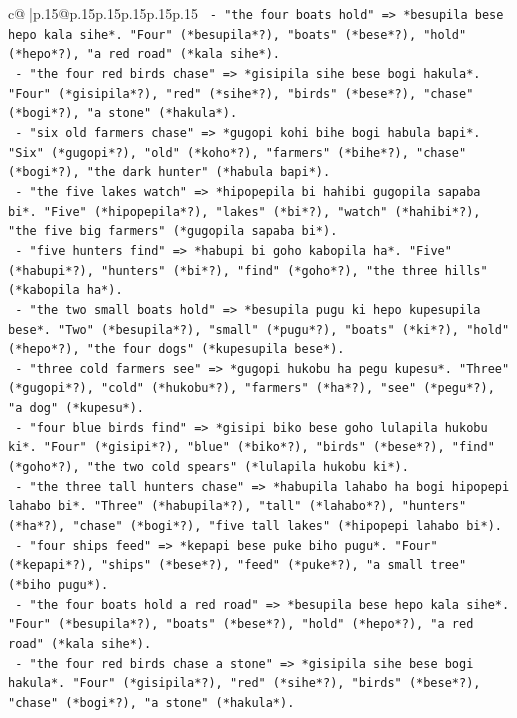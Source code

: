\documentclass{article}
\begin{document}
{\begin{supertabular}{c@{$\;$}|p{.15\linewidth}@{}p{.15\linewidth}p{.15\linewidth}p{.15\linewidth}p{.15\linewidth}p{.15\linewidth}}
{{{\texttt{         {-} "the four boats hold" => *besupila bese hepo kala sihe*. "Four" (*besupila*?), "boats" (*bese*?), "hold" (*hepo*?), "a red road" (*kala sihe*).} \\
\texttt{         {-} "the four red birds chase" => *gisipila sihe bese bogi hakula*. "Four" (*gisipila*?), "red" (*sihe*?), "birds" (*bese*?), "chase" (*bogi*?), "a stone" (*hakula*).} \\
\texttt{         {-} "six old farmers chase" => *gugopi kohi bihe bogi habula bapi*. "Six" (*gugopi*?), "old" (*koho*?), "farmers" (*bihe*?), "chase" (*bogi*?), "the dark hunter" (*habula bapi*).} \\
\texttt{         {-} "the five lakes watch" => *hipopepila bi hahibi gugopila sapaba bi*. "Five" (*hipopepila*?), "lakes" (*bi*?), "watch" (*hahibi*?), "the five big farmers" (*gugopila sapaba bi*).} \\
\texttt{         {-} "five hunters find" => *habupi bi goho kabopila ha*. "Five" (*habupi*?), "hunters" (*bi*?), "find" (*goho*?), "the three hills" (*kabopila ha*).} \\
\texttt{         {-} "the two small boats hold" => *besupila pugu ki hepo kupesupila bese*. "Two" (*besupila*?), "small" (*pugu*?), "boats" (*ki*?), "hold" (*hepo*?), "the four dogs" (*kupesupila bese*).} \\
\texttt{         {-} "three cold farmers see" => *gugopi hukobu ha pegu kupesu*. "Three" (*gugopi*?), "cold" (*hukobu*?), "farmers" (*ha*?), "see" (*pegu*?), "a dog" (*kupesu*).} \\
\texttt{         {-} "four blue birds find" => *gisipi biko bese goho lulapila hukobu ki*. "Four" (*gisipi*?), "blue" (*biko*?), "birds" (*bese*?), "find" (*goho*?), "the two cold spears" (*lulapila hukobu ki*).} \\
\texttt{         {-} "the three tall hunters chase" => *habupila lahabo ha bogi hipopepi lahabo bi*. "Three" (*habupila*?), "tall" (*lahabo*?), "hunters" (*ha*?), "chase" (*bogi*?), "five tall lakes" (*hipopepi lahabo bi*).} \\
\texttt{         {-} "four ships feed" => *kepapi bese puke biho pugu*. "Four" (*kepapi*?), "ships" (*bese*?), "feed" (*puke*?), "a small tree" (*biho pugu*).} \\
\texttt{         {-} "the four boats hold a red road" => *besupila bese hepo kala sihe*. "Four" (*besupila*?), "boats" (*bese*?), "hold" (*hepo*?), "a red road" (*kala sihe*).} \\
\texttt{         {-} "the four red birds chase a stone" => *gisipila sihe bese bogi hakula*. "Four" (*gisipila*?), "red" (*sihe*?), "birds" (*bese*?), "chase" (*bogi*?), "a stone" (*hakula*).} \\
}}}
\end{supertabular}}
\end{document}
